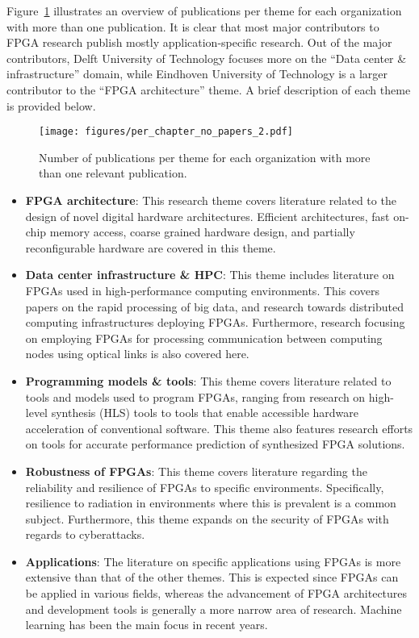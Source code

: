 Figure~\ref{fig:org-publish-per-theme} illustrates an overview of publications per theme for each organization with more than one publication. It is clear that most major contributors to FPGA research publish mostly application-specific research. Out of the major contributors, Delft University of Technology focuses more on the ``Data center \& infrastructure'' domain, while Eindhoven University of Technology is a larger contributor to the ``FPGA architecture'' theme. A brief description of each theme is provided below. 


\begin{figure}[!htb]
    \centering
    \texttt{[image: figures/per\_chapter\_no\_papers\_2.pdf]}
    \caption{Number of publications per theme for each organization with more than one relevant publication.}
    \label{fig:org-publish-per-theme}
\end{figure}


\begin{itemize}
    \item {\bf FPGA architecture}: This research theme covers literature related to the design of novel digital hardware architectures. Efficient architectures, fast on-chip memory access, coarse grained hardware design, and partially reconfigurable hardware are covered in this theme.
\item {\bf Data center infrastructure \& HPC}: This theme includes literature on FPGAs used in high-performance computing environments. This covers papers on the rapid processing of big data, and research towards distributed computing infrastructures deploying FPGAs. Furthermore, research focusing on employing FPGAs for processing communication between computing nodes using optical links is also covered here.
\item {\bf Programming models \& tools}:
This theme covers literature related to tools and models used to program FPGAs, ranging from research on high-level synthesis (HLS) tools to tools that enable accessible hardware acceleration of conventional software. This theme also features research efforts on tools for accurate performance prediction of synthesized 
FPGA solutions.
\item {\bf Robustness of FPGAs}:
This theme covers literature regarding the reliability and resilience of FPGAs to specific environments. Specifically, resilience to radiation in environments where this is prevalent is a common subject. Furthermore, this theme expands on the security of FPGAs with regards to cyberattacks.
\item {\bf Applications}: The literature on specific applications using FPGAs is more extensive than that of the other themes. This is expected since FPGAs can be applied in various fields, whereas the advancement of FPGA architectures and development tools is generally a more narrow area of research. 
Machine learning has been the main focus in recent years.
\end{itemize}

